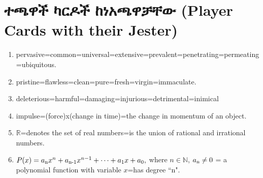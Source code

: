 \documentclass[a4paper,12pt]{article}
\newenvironment{geez}{\geezfont}{}
\theoremstyle{mystyle}
\numberwithin{equation}{section}
\numberwithin{theorem}{section}
\numberwithin{proposition}{section}
\numberwithin{example}{section}
\numberwithin{remark}{section}
\numberwithin{lemma}{section}
\numberwithin{corollary}{section}
\numberwithin{definition}{section}
\numberwithin{amharicdefinition}{section}
\begin{document}
\section{\begin{geez}ተጫዋች ካርዶች ከነአጫዋቻቸው (Player Cards with their Jester)\end{geez}}
\label{S:3}
\begin{enumerate}
\item pervasive=common=universal=extensive=prevalent=penetrating=permeating=ubiquitous.
\item pristine=flawless=clean=pure=fresh=virgin=immaculate.
\item deleterious=harmful=damaging=injurious=detrimental=inimical
\item impulse=(force)x(change in time)=the change in momentum of an object.
\item $\mathbb{R}$=denotes the set of real numbers=is the union of rational and irrational numbers.
\item $P(x)=a\textsubscript {n}x^n+a\textsubscript {n-1}x^{n-1}+\cdots+a\textsubscript {1}x+a\textsubscript {0},$
where $n\in \mathbb{N}$, $a\textsubscript {n}\ne 0$ = a polynomial function with variable $x$=has degree ``n".
\end{enumerate}
\printbibliography
\end{document}
